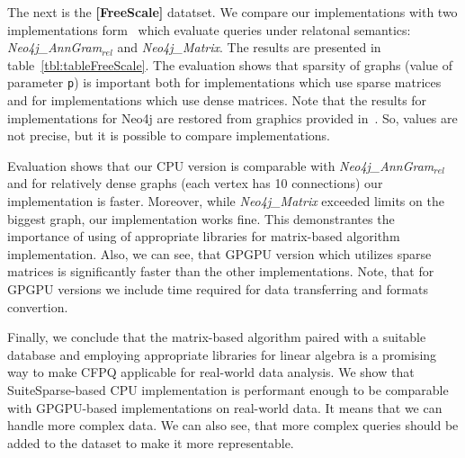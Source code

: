 The next is the \textbf{[FreeScale]} datatset.
We compare our implementations with two implementations form~\cite{Kuijpers:2019:ESC:3335783.3335791} which evaluate queries under relatonal semantics: \textit{Neo4j\_AnnGram${_\textit{rel}}$} and \textit{Neo4j\_Matrix}. The results are presented in table~\ref{tbl:tableFreeScale}.
The evaluation shows that sparsity of graphs (value of parameter \texttt{p}) is important both for implementations which use sparse matrices and for implementations which use dense matrices.
Note that the results for implementations for Neo4j are restored from graphics provided in~\cite{Kuijpers:2019:ESC:3335783.3335791}.
So, values are not precise, but it is possible to compare implementations.

Evaluation shows that our CPU version is comparable with \textit{Neo4j\_AnnGram$_{\textit{rel}}$} and for relatively dense graphs (each vertex has 10 connections) our implementation is faster. Moreover, while \textit{Neo4j\_Matrix} exceeded limits on the biggest graph, our implementation works fine.
This demonstrantes the importance of using of appropriate libraries for matrix-based algorithm implementation.
Also, we can see, that GPGPU version which utilizes sparse matrices is significantly faster than the other implementations.
Note, that for GPGPU versions we include time required for data transferring and formats convertion.

Finally, we conclude that the matrix-based algorithm paired with a suitable database and employing appropriate libraries for linear algebra is a promising way to make CFPQ applicable for real-world data analysis.
We show that SuiteSparse-based CPU implementation is performant enough to be comparable with GPGPU-based implementations on real-world data.
It means that we can handle more complex data.
We can also see, that more complex queries should be added to the dataset to make it more representable.


